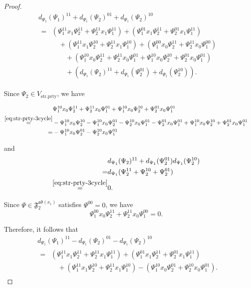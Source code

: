\documentclass[15pt,oneside,reqno]{amsart}
\theoremstyle{remark}{
\newtheorem{lem}[df]{Lemma}
\newtheorem{prop}[df]{Proposition}
\newtheorem{ex}[df]{Example}
\newtheorem{rmk}[df]{Remark}
}
\newcommand{\ad}{\mathfrak{ad}}
\newcommand{\Fad}{\mathfrak{F}_2^{\ad(x_1)}}
\newcommand{\strprty}{\mathrm{str.prty}}
\begin{document}
\begin{proof}
\begin{align*}
&d_{\Psi_1}(\Psi_1)^{11} + d_{\Psi_1}(\Psi_2)^{01} + d_{\Psi_1}(\Psi_2)^{10}\\
&\begin{aligned}
=&(\Psi_{1}^{11}x_1\Psi_2^{11} + \Psi_{2}^{11}x_1\Psi_1^{11}) + ( \Psi_1^{01}x_1\Psi_2^{11} + \Psi_2^{01}x_1\Psi_1^{11}) \\
&\quad+(\Psi_1^{11}x_1\Psi_2^{10} + \Psi_2^{11}x_1\Psi_1^{10}) + (\Psi_1^{00}x_0\Psi_2^{11} + \Psi_2^{11}x_0\Psi_1^{00})\\
&\qquad + (\Psi_{1}^{10}x_0\Psi_2^{11} +  \Psi_{2}^{11}x_0\Psi_1^{01} + \Psi_1^{10}x_0\Psi_2^{10} + \Psi_2^{01}x_0 \Psi_1^{01})\\
&\qquad +(d_{\Psi_1}(\Psi_2)^{11} + d_{\Psi_1}(\Psi_2^{01}) + d_{\Psi_1}(\Psi_2^{10})).
\end{aligned}
\end{align*}

Since $\Psi_2 \in V_{\strprty}$, we have

\begin{align*}
 &\Psi_{1}^{10}x_0\Psi_2^{11} +  \Psi_{2}^{11}x_0\Psi_1^{01} + \Psi_1^{10}x_0\Psi_2^{10} + \Psi_2^{01}x_0 \Psi_1^{01}\\
\stackrel{\eqref{eq:str-prty-3cycle}}{=}&-\Psi_{1}^{10}x_0\Psi_2^{10} - \Psi_{1}^{10}x_0\Psi_2^{01}  -  \Psi_{2}^{10}x_0\Psi_1^{01} -  \Psi_{2}^{01}x_0\Psi_1^{01} + \Psi_1^{10}x_0\Psi_2^{10} + \Psi_2^{01}x_0 \Psi_1^{01}\\
=&-\Psi_{1}^{10}x_0\Psi_2^{01}  -  \Psi_{2}^{10}x_0\Psi_1^{01} 
\end{align*}

and 
\begin{align*}
&d_{\Psi_1}(\Psi_2)^{11} + d_{\Psi_1}(\Psi_2^{01})  d_{\Psi_1}(\Psi_2^{10}) \\
=&d_{\Psi_1}(\Psi_2^{11} + \Psi_2^{10} + \Psi_2^{01})\\
\stackrel{\eqref{eq:str-prty-3cycle}}{=}& 0.
\end{align*}

Since $\Psi \in \Fad$ satisfies $\Psi^{00} = 0$, we have
\[
\Psi_1^{00}x_0\Psi_2^{11} + \Psi_2^{11}x_0\Psi_1^{00} = 0.
\]


Therefore, it follows that
\begin{align*}
&d_{\Psi_1}(\Psi_1)^{11} - d_{\Psi_1}(\Psi_2)^{01} - d_{\Psi_1}(\Psi_2)^{10}\\
&\begin{aligned}
=&(\Psi_{1}^{11}x_1\Psi_2^{11} + \Psi_{2}^{11}x_1\Psi_1^{11}) + ( \Psi_1^{01}x_1\Psi_2^{11} + \Psi_2^{01}x_1\Psi_1^{11}) \\
&\quad +(\Psi_1^{11}x_1\Psi_2^{10} + \Psi_2^{11}x_1\Psi_1^{10}) - (\Psi_{1}^{10}x_0\Psi_2^{01}  +  \Psi_{2}^{10}x_0\Psi_1^{01} ).
\end{aligned}
\end{align*}

\end{proof}
\end{document}
